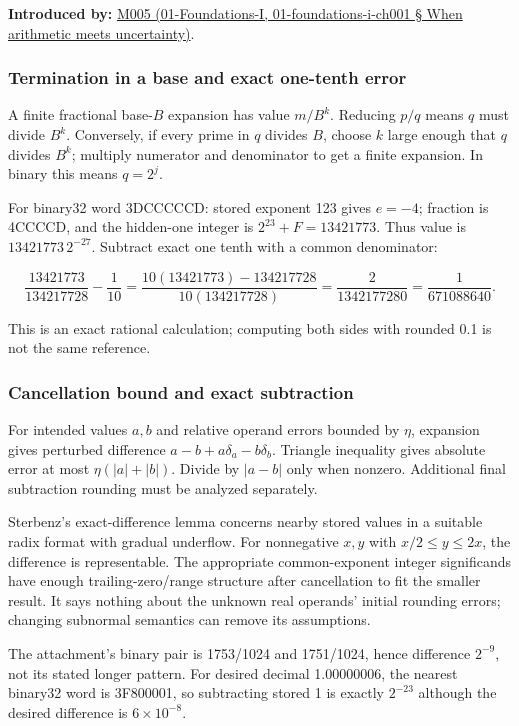 \textbf{Introduced by:} \href{}{M005 (01-Foundations-I, 01-foundations-i-ch001 § When arithmetic meets uncertainty)}.

\subsubsection{Termination in a base and exact one-tenth error}\label{termination-in-a-base-and-exact-one-tenth-error}

A finite fractional base-\(B\) expansion has value \(m/B^k\). Reducing \(p/q\) means \(q\) must divide \(B^k\). Conversely, if every prime in \(q\) divides \(B\), choose \(k\) large enough that \(q\) divides \(B^k\); multiply numerator and denominator to get a finite expansion. In binary this means \(q=2^j\).

For binary32 word 3DCCCCCD: stored exponent 123 gives \(e=-4\); fraction is 4CCCCD, and the hidden-one integer is \(2^{23}+F=13421773\). Thus value is \(13421773\,2^{-27}\). Subtract exact one tenth with a common denominator:

\[
\frac{13421773}{134217728}-\frac1{10}
=\frac{10(13421773)-134217728}{10(134217728)}
=\frac{2}{1342177280}=\frac1{671088640}.
\]

This is an exact rational calculation; computing both sides with rounded 0.1 is not the same reference.

\subsubsection{Cancellation bound and exact subtraction}\label{cancellation-bound-and-exact-subtraction}

For intended values \(a,b\) and relative operand errors bounded by \(\eta\), expansion gives perturbed difference \(a-b+a\delta_a-b\delta_b\). Triangle inequality gives absolute error at most \(\eta(|a|+|b|)\). Divide by \(|a-b|\) only when nonzero. Additional final subtraction rounding must be analyzed separately.

Sterbenz's exact-difference lemma concerns nearby stored values in a suitable radix format with gradual underflow. For nonnegative \(x,y\) with \(x/2\le y\le2x\), the difference is representable. The appropriate common-exponent integer significands have enough trailing-zero/range structure after cancellation to fit the smaller result. It says nothing about the unknown real operands' initial rounding errors; changing subnormal semantics can remove its assumptions.

The attachment's binary pair is 1753/1024 and 1751/1024, hence difference \(2^{-9}\), not its stated longer pattern. For desired decimal 1.00000006, the nearest binary32 word is 3F800001, so subtracting stored 1 is exactly \(2^{-23}\) although the desired difference is \(6\times10^{-8}\).

